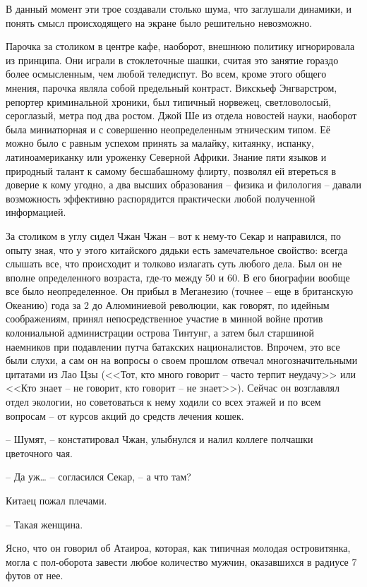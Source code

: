 В данный момент эти трое создавали столько шума, что заглушали динамики, и понять смысл происходящего на экране было решительно невозможно.

Парочка за столиком в центре кафе, наоборот, внешнюю политику игнорировала из принципа. Они играли в стоклеточные шашки, считая это занятие гораздо более осмысленным, чем любой теледиспут. Во всем, кроме этого общего мнения, парочка являла собой предельный контраст. Викскьеф Энгварстром, репортер криминальной хроники, был типичный норвежец, светловолосый, сероглазый, метра под два ростом. Джой Ше из отдела новостей науки, наоборот была миниатюрная и с совершенно неопределенным этническим типом. Её можно было с равным успехом принять за малайку, китаянку, испанку, латиноамериканку или уроженку Северной Африки. Знание пяти языков и природный талант к самому бесшабашному флирту, позволял ей втереться в доверие к кому угодно, а два высших образования -- физика и филология -- давали возможность эффективно распорядится практически любой полученной информацией.

За столиком в углу сидел Чжан Чжан -- вот к нему-то Секар и направился, по опыту зная, что у этого китайского дядьки есть замечательное свойство: всегда слышать все, что происходит и толково излагать суть любого дела. Был он не вполне определенного возраста, где-то между 50 и 60. В его биографии вообще все было неопределенное. Он прибыл в Меганезию (точнее -- еще в британскую Океанию) года за 2 до Алюминиевой революции, как говорят, по идейным соображениям, принял непосредственное участие в минной войне против колониальной администрации острова Тинтунг, а затем был старшиной наемников при подавлении путча батакских националистов. Впрочем, это все были слухи, а сам он на вопросы о своем прошлом отвечал многозначительными цитатами из Лао Цзы (<<Тот, кто много говорит -- часто терпит неудачу>> или <<Кто знает -- не говорит, кто говорит -- не знает>>). Сейчас он возглавлял отдел экологии, но советоваться к нему ходили со всех этажей и по всем вопросам -- от курсов акций до средств лечения кошек.

-- Шумят, -- констатировал Чжан, улыбнулся и налил коллеге полчашки цветочного чая.

-- Да уж\ldots{} -- согласился Секар, -- а что там?

Китаец пожал плечами.

-- Такая женщина.

Ясно, что он говорил об Атаироа, которая, как типичная молодая островитянка, могла с пол-оборота завести любое количество мужчин, оказавшихся в радиусе 7 футов от нее.

